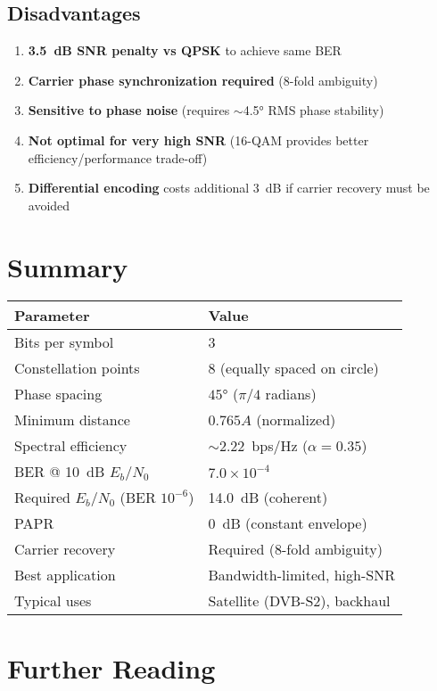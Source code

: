 \subsection*{Disadvantages}

\begin{enumerate}
\item \textbf{3.5~dB SNR penalty vs QPSK} to achieve same BER
\item \textbf{Carrier phase synchronization required} (8-fold ambiguity)
\item \textbf{Sensitive to phase noise} (requires $\sim$4.5° RMS phase stability)
\item \textbf{Not optimal for very high SNR} (16-QAM provides better efficiency/performance trade-off)
\item \textbf{Differential encoding} costs additional 3~dB if carrier recovery must be avoided
\end{enumerate}

\section{Summary}

\begin{center}
\begin{tabular}{@{}ll@{}}
\toprule
\textbf{Parameter} & \textbf{Value} \\
\midrule
Bits per symbol & 3 \\
Constellation points & 8 (equally spaced on circle) \\
Phase spacing & $45°$ ($\pi/4$ radians) \\
Minimum distance & $0.765A$ (normalized) \\
Spectral efficiency & $\sim$2.22~bps/Hz ($\alpha = 0.35$) \\
BER @ 10~dB $E_b/N_0$ & $7.0 \times 10^{-4}$ \\
Required $E_b/N_0$ (BER $10^{-6}$) & 14.0~dB (coherent) \\
PAPR & 0~dB (constant envelope) \\
Carrier recovery & Required (8-fold ambiguity) \\
Best application & Bandwidth-limited, high-SNR \\
Typical uses & Satellite (DVB-S2), backhaul \\
\bottomrule
\end{tabular}
\end{center}

\section{Further Reading}

